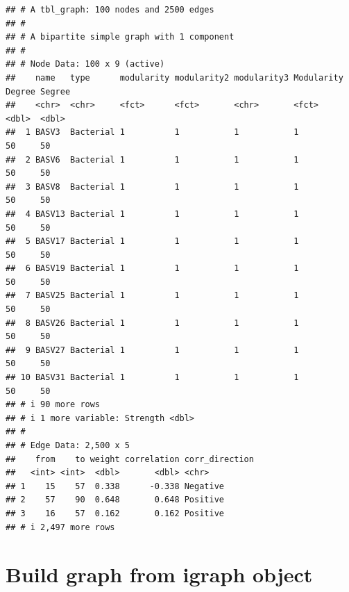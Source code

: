 \documentclass[
]{book}
\newenvironment{Shaded}{\begin{snugshade}}{\end{snugshade}}
\newcommand{\AttributeTok}[1]{\textcolor[rgb]{0.13,0.29,0.53}{#1}}
\newcommand{\CommentTok}[1]{\textcolor[rgb]{0.56,0.35,0.01}{\textit{#1}}}
\newcommand{\ConstantTok}[1]{\textcolor[rgb]{0.56,0.35,0.01}{#1}}
\newcommand{\FunctionTok}[1]{\textcolor[rgb]{0.13,0.29,0.53}{\textbf{#1}}}
\newcommand{\NormalTok}[1]{#1}
\newcommand{\OtherTok}[1]{\textcolor[rgb]{0.56,0.35,0.01}{#1}}
\newcommand{\SpecialCharTok}[1]{\textcolor[rgb]{0.81,0.36,0.00}{\textbf{#1}}}
\newcommand{\StringTok}[1]{\textcolor[rgb]{0.31,0.60,0.02}{#1}}
\begin{document}
\begin{verbatim}
## # A tbl_graph: 100 nodes and 2500 edges
## #
## # A bipartite simple graph with 1 component
## #
## # Node Data: 100 x 9 (active)
##    name   type      modularity modularity2 modularity3 Modularity Degree Segree
##    <chr>  <chr>     <fct>      <fct>       <chr>       <fct>       <dbl>  <dbl>
##  1 BASV3  Bacterial 1          1           1           1              50     50
##  2 BASV6  Bacterial 1          1           1           1              50     50
##  3 BASV8  Bacterial 1          1           1           1              50     50
##  4 BASV13 Bacterial 1          1           1           1              50     50
##  5 BASV17 Bacterial 1          1           1           1              50     50
##  6 BASV19 Bacterial 1          1           1           1              50     50
##  7 BASV25 Bacterial 1          1           1           1              50     50
##  8 BASV26 Bacterial 1          1           1           1              50     50
##  9 BASV27 Bacterial 1          1           1           1              50     50
## 10 BASV31 Bacterial 1          1           1           1              50     50
## # i 90 more rows
## # i 1 more variable: Strength <dbl>
## #
## # Edge Data: 2,500 x 5
##    from    to weight correlation corr_direction
##   <int> <int>  <dbl>       <dbl> <chr>         
## 1    15    57  0.338      -0.338 Negative      
## 2    57    90  0.648       0.648 Positive      
## 3    16    57  0.162       0.162 Positive      
## # i 2,497 more rows
\end{verbatim}

\section{Build graph from igraph object}\label{build-graph-from-igraph-object}

\begin{Shaded}
\end{Shaded}
\end{document}
